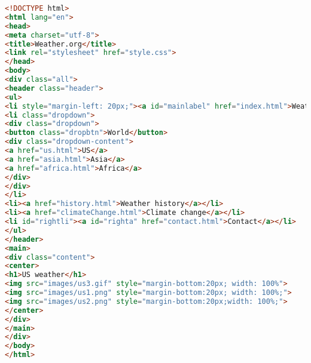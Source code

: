 \begin{lstlisting}[language=HTML,caption=Исходный код стилей US]
<!DOCTYPE html>
<html lang="en">
<head>
<meta charset="utf-8">
<title>Weather.org</title>
<link rel="stylesheet" href="style.css">
</head>
<body>
<div class="all">
<header class="header">
<ul>
<li style="margin-left: 20px;"><a id="mainlabel" href="index.html">Weather.org</a></li>
<li class="dropdown">
<div class="dropdown">
<button class="dropbtn">World</button>
<div class="dropdown-content">
<a href="us.html">US</a>
<a href="asia.html">Asia</a>
<a href="africa.html">Africa</a>
</div>
</div>
</li>
<li><a href="history.html">Weather history</a></li>
<li><a href="climateChange.html">Climate change</a></li>
<li id="rightli"><a id="righta" href="contact.html">Contact</a></li>
</ul>
</header>
<main>
<div class="content">
<center>
<h1>US weather</h1>
<img src="images/us3.gif" style="margin-bottom:20px; width: 100%">
<img src="images/us1.png" style="margin-bottom:20px; width: 100%;">
<img src="images/us2.png" style="margin-bottom:20px;width: 100%;">
</center>
</div>
</main>
</div>
</body>
</html>
\end{lstlisting}



